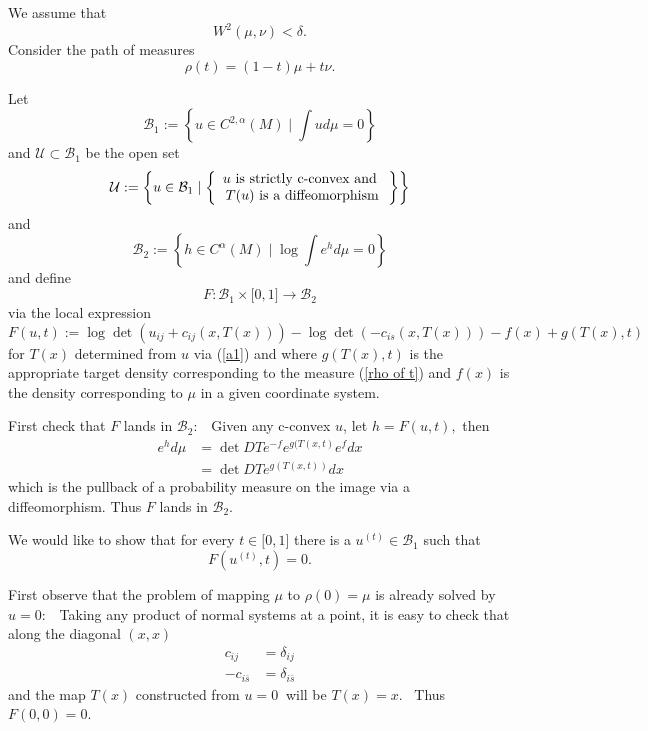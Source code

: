 \documentclass[11pt,letterpaper]{amsart}%
\numberwithin{equation}{section}
\begin{document}
We assume that
\[
W^{2}(\mu,\nu)<\delta.
\]
Consider the path of measures
\begin{equation}
\rho(t)=(1-t)\mu+t\nu. \label{rho of t}%
\end{equation}

Let
\[
\mathcal{B}_{1}:=\left\{  u\in C^{2,\alpha}(M)\mid\int ud\mu=0\right\}
\]
and $\mathcal{U\subset B}_{1}$ be the open set
\[
\mathcal{U}:=\left\{  u\in\mathcal{B}_{1}\mid\left\{
\begin{array}
[c]{c}%
u\text{ is strictly c-convex and }\\
T(u)\text{ is a diffeomorphism}%
\end{array}
\right\}  \right\}
\]
and
\[
\mathcal{B}_{2}:=\left\{  h\in C^{\alpha}(M)\mid\log\int e^{h}d\mu=0\right\}
\]
and define%
\[
F:\mathcal{B}_{1}\times\lbrack0,1]\rightarrow\mathcal{B}_{2}%
\]
via the local expression \
\[
F(u,t):=\log\det\left(  u_{ij}+c_{ij}(x,T(x))\right)  -\log\det(-c_{is}%
(x,T(x)))-f(x)+g(T(x),t)
\]
for $T(x)$ determined from $u$ via (\ref{a1}) and where $g(T(x),t)$ is the appropriate target
density corresponding to the measure (\ref{rho of t}) and $f(x)$ is the
density corresponding to $\mu$ in a given coordinate system.

First check that $F$ lands in $\mathcal{B}_{2}:$ \ Given any c-convex $u$, let
$h=F(u,t),$ then
\begin{align*}
e^{h}d\mu &  =\det DTe^{-f}e^{g(T\left(  x,t\right)  }e^{f}dx\\
&  =\det DTe^{g(T\left(  x,t\right) ) }dx
\end{align*}
which is the pullback of a probability measure on the image via a
diffeomorphism. Thus $F$ lands in $\mathcal{B}_{2}.$

We would like to show that for every $t\in\lbrack0,1]$ there is a
$u^{(t)} \in\mathcal{B}_{1}$ such that
\[
F(u^{(t)},t)=0.
\]


First observe that the problem of mapping $\mu$ to $\rho(0)=\mu$ is already
solved by $u=0:$ \ Taking any product of normal systems at a point, it is easy
to check that along the diagonal $(x,x)$
\begin{align*}
c_{ij}  &  =\delta_{ij}\\
-c_{i\bar{s}}  &  =\delta_{i\bar{s}}%
\end{align*}
and the map $T(x)$ constructed from $u=0$ $\ $will be $T(x)=x.$ \ Thus
$F(0,0)=0.$
\end{document}
